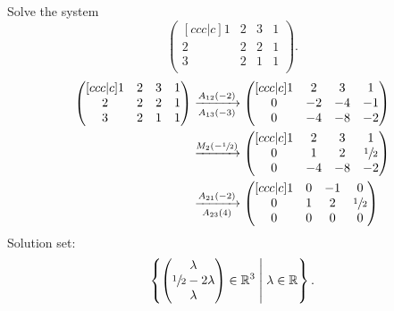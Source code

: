 \begin{example}
    Solve the system
    \[
        \begin{pmatrix}[ccc|c]
            1&2&3&1\\
            2&2&2&1\\
            3&2&1&1\\
        \end{pmatrix}
        .
    \]
    \begin{align*}
        \begin{pmatrix}[ccc|c]
            1&2&3&1\\
            2&2&2&1\\
            3&2&1&1\\
        \end{pmatrix}
        &\eroarrow{A_{12}(-2)}{A_{13}(-3)}
        \begin{pmatrix}[ccc|c]
            1&2&3&1\\
            0&-2&-4&-1\\
            0&-4&-8&-2\\
        \end{pmatrix}
        \\
        &\eroarrow{M_{2}(-\sfrac12)}{}
        \begin{pmatrix}[ccc|c]
            1&2&3&1\\
            0&1&2&\sfrac12\\
            0&-4&-8&-2\\
        \end{pmatrix}
        \\
        &\eroarrow{A_{21}(-2)}{A_{23}(4)}
        \begin{pmatrix}[ccc|c]
            1&0&-1&0\\
            0&1&2&\sfrac12\\
            0&0&0&0\\
        \end{pmatrix}
        \\
    \end{align*}
    Solution set: 
    \[
        \left\{
            \begin{pmatrix}
                \lambda\\
                \sfrac12-2\lambda\\
                \lambda\\
            \end{pmatrix}
            \in\mathbb R^3\;\middle\vert\;\lambda\in\mathbb R
        \right\}
        .
    \]
\end{example}

